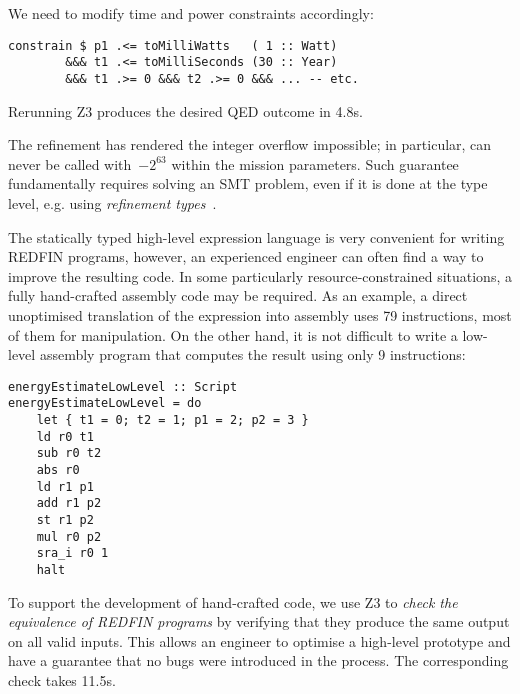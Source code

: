 \noindent
We need to modify time and power constraints accordingly:

\begin{verbatim}
constrain $ p1 .<= toMilliWatts   ( 1 :: Watt)
        &&& t1 .<= toMilliSeconds (30 :: Year)
        &&& t1 .>= 0 &&& t2 .>= 0 &&& ... -- etc.
\end{verbatim}

\noindent
Rerunning Z3 produces the desired \textsf{QED} outcome in 4.8s.

The refinement has rendered the integer overflow impossible;
in particular,  can never be called with~$-2^{63}$
within the mission parameters. Such guarantee fundamentally requires
solving an SMT problem, even if it is done at the type level, e.g. using
\emph{refinement types}~\cite{vazou2014refinement}.

The statically typed high-level expression language is very convenient for
writing REDFIN programs, however, an experienced engineer can often find a way
to improve the resulting code. In some particularly resource-constrained situations,
a fully hand-crafted assembly code may be required. As an example, a direct
unoptimised translation of the  expression into assembly uses
79 instructions, most of them for  manipulation.
On the other hand, it is not difficult to write a low-level assembly program that
computes the result using only 9 instructions:

\vspace{-0.5mm}
\begin{verbatim}
energyEstimateLowLevel :: Script
energyEstimateLowLevel = do
    let { t1 = 0; t2 = 1; p1 = 2; p2 = 3 }
    ld r0 t1
    sub r0 t2
    abs r0
    ld r1 p1
    add r1 p2
    st r1 p2
    mul r0 p2
    sra_i r0 1
    halt
\end{verbatim}
\label{energyEstimateLowLevel}
\vspace{-0.5mm}

\noindent
To support the development of hand-crafted code, we use Z3 to \emph{check the
equivalence of REDFIN programs} by verifying that they produce
the same output on all valid inputs. This allows an engineer to
optimise a high-level prototype and have a guarantee that no bugs were
introduced in the process. The corresponding  check takes 11.5s.

